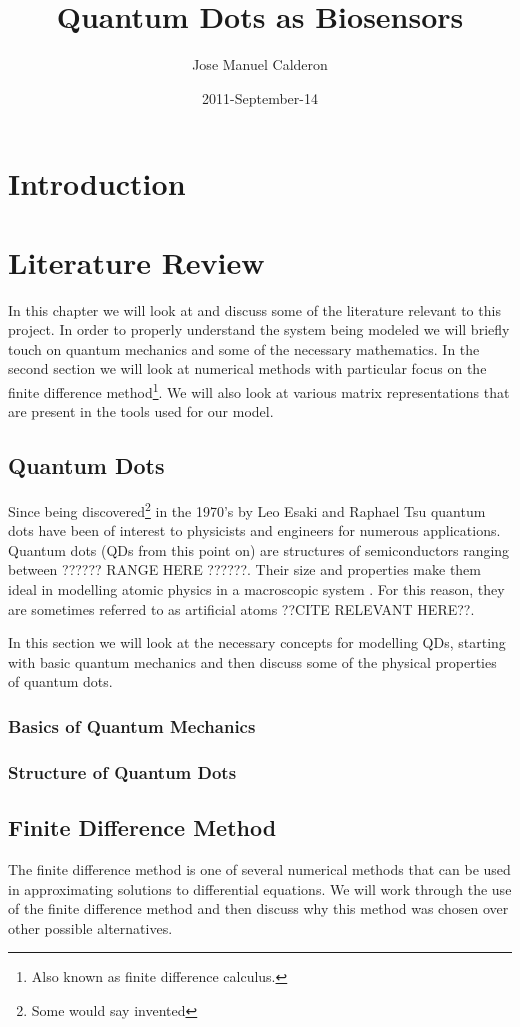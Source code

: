 \documentclass[authoryearcitations]{UoYCSproject}
\author{Jose Manuel Calderon}
\title{Quantum Dots as Biosensors}
\date{2011-September-14}
\begin{document}
 
\maketitle
\chapter{Introduction}

\chapter{Literature Review}
In this chapter we will look at and discuss some of the literature relevant to this project. 
In order to properly understand the system being modeled we will briefly touch on quantum mechanics
and some of the necessary mathematics. In the second section we will look at numerical methods with
particular focus on the finite difference method\footnote{Also known as finite difference calculus.}.
We will also look at various matrix representations that are present in the tools used for our
model. 
 
\section{Quantum Dots}
Since being discovered\footnote{Some would say invented} in the 1970's by Leo Esaki and 
Raphael Tsu quantum dots have been of interest to physicists and engineers for numerous applications. 
Quantum dots (QDs from this point on) are structures of semiconductors ranging between ??????
RANGE HERE ??????. Their size and properties make them ideal in modelling atomic physics in a
macroscopic system \cite{Li}. For this reason, they are sometimes referred to as artificial atoms 
??CITE RELEVANT HERE??.

In this section we will look at the necessary concepts for modelling QDs, starting with basic 
quantum mechanics and then discuss some of the physical properties of quantum dots.

 
\subsection{Basics of Quantum Mechanics}

\subsection{Structure of Quantum Dots}


\section{Finite Difference Method}
The finite difference method is one of several numerical methods that can be used in approximating
solutions to differential equations\cite{Hamming}. We will work through the use of the finite 
difference method and then discuss why this method was chosen over other possible alternatives. 
\end{document}
